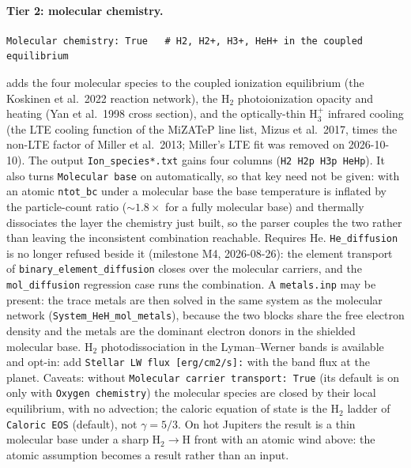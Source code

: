 \documentclass[english,a4paper]{my_memo}
\begin{document}
\paragraph{Tier 2: molecular chemistry.}
\begin{verbatim}
Molecular chemistry: True   # H2, H2+, H3+, HeH+ in the coupled equilibrium
\end{verbatim}
adds the four molecular species to the coupled ionization equilibrium (the
Koskinen et al.\ 2022 reaction network), the H$_2$ photoionization opacity and
heating (Yan et al.\ 1998 cross section), and the optically-thin H$_3^+$
infrared cooling (the LTE cooling function of the MiZATeP line list, Mizus
et al.\ 2017, times the non-LTE factor of Miller et al.\ 2013; Miller's LTE fit
was removed on 2026-10-10). The output
\texttt{Ion\_species*.txt} gains four columns (\texttt{H2 H2p H3p HeHp}).
It also turns \texttt{Molecular base} on automatically, so that key need not be
given: with an atomic \texttt{ntot\_bc} under a molecular base the base
temperature is inflated by the particle-count ratio (${\sim}1.8\times$ for a
fully molecular base) and thermally dissociates the layer the chemistry just
built, so the parser couples the two rather than leaving the inconsistent
combination reachable.
Requires He. \texttt{He\_diffusion} is no longer refused beside it
(milestone M4, 2026-08-26): the element transport of
\texttt{binary\_element\_diffusion} closes over the molecular carriers, and
the \texttt{mol\_diffusion} regression case runs the combination. A
\texttt{metals.inp} may be present: the trace metals are then solved in the
same system as the molecular network (\texttt{System\_HeH\_mol\_metals}),
because the two blocks share the free electron density and the metals are the
dominant electron donors in the shielded molecular base. H$_2$
photodissociation in the Lyman--Werner bands is available and opt-in: add
\texttt{Stellar LW flux [erg/cm2/s]:} with the band flux at the planet.
Caveats: without \texttt{Molecular carrier transport: True} (its default
is on only with \texttt{Oxygen chemistry}) the molecular species are closed
by their local equilibrium, with no advection; the caloric equation of state
is the H$_2$ ladder of \texttt{Caloric EOS} (default), not $\gamma=5/3$.
On hot Jupiters the result is a thin molecular base under a sharp
H$_2\to$H front with an atomic wind above: the atomic assumption becomes a
result rather than an input.
\end{document}
